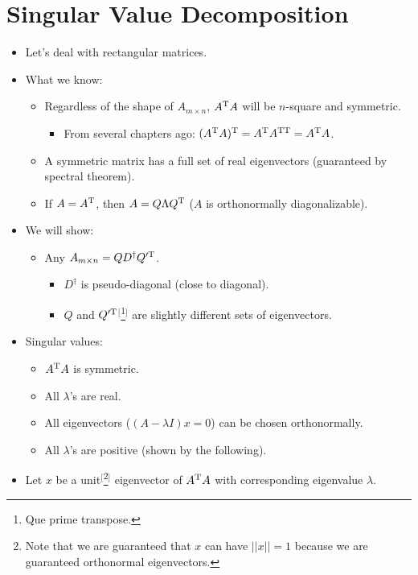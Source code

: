 \documentclass{article}
\begin{document}
\section*{Singular Value Decomposition}
\begin{itemize}
    \item {}Let's deal with rectangular matrices.
    \item What we know:
    \begin{itemize}
        \item Regardless of the shape of $A_{m\times n}$, $A^{\text{T}} A$ will be $n$-square and symmetric.
        \begin{itemize}
            \item From several chapters ago: $(A^{\text{T}} A)^{\text{T}} = A^{\text{T}} A^{\text{T}\text{T}} = A^{\text{T}} A$.
        \end{itemize}
        \item A symmetric matrix has a full set of real eigenvectors (guaranteed by spectral theorem).
        \item If $A=A^{\text{T}}$, then $A=Q\Lambda Q^{\text{T}}$ ($A$ is orthonormally diagonalizable).
    \end{itemize}
    \item We will show:
    \begin{itemize}
        \item Any $A_{m\times n}=QD^\dagger Q'^{\text{T}}$.
        \begin{itemize}
            \item $D^\dagger$ is pseudo-diagonal (close to diagonal).
            \item $Q$ and $Q'^{\text{T}}$$^[$\footnote{Que prime transpose.}$^]$ are slightly different sets of eigenvectors.
        \end{itemize}
    \end{itemize}
    \item Singular values:
    \begin{itemize}
        \item $A^{\text{T}} A$ is symmetric.
        \item All $\lambda$'s are real.
        \item All eigenvectors ($(A-\lambda I)x=0$) can be chosen orthonormally.
        \item All $\lambda$'s are positive (shown by the following).
    \end{itemize}
    \item Let $x$ be a unit$^[$\footnote{Note that we are guaranteed that $x$ can have $||x||=1$ because we are guaranteed orthonormal eigenvectors.}$^]$ eigenvector of $A^{\text{T}} A$ with corresponding eigenvalue $\lambda$.

\end{itemize}
\end{document}
